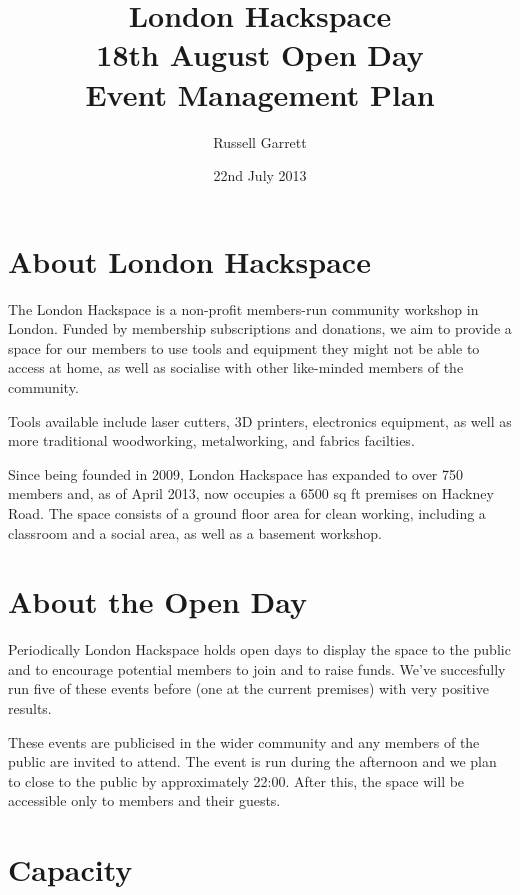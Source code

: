 \title{London Hackspace\\
    18th August Open Day\\
    Event Management Plan
}


\date{22nd July 2013}

\author{Russell Garrett}

\maketitle

\section{About London Hackspace}

The London Hackspace is a non-profit members-run community workshop in London.
Funded by membership subscriptions and donations, we aim to provide a space for
our members to use tools and equipment they might not be able to access at
home, as well as socialise with other like-minded members of the community.

Tools available include laser cutters, 3D printers, electronics equipment,
as well as more traditional woodworking, metalworking, and fabrics facilties.

Since being founded in 2009, London Hackspace has expanded to over 750 members
and, as of April 2013, now occupies a 6500 sq ft premises on Hackney Road.
The space consists of a ground floor area for clean working, including a
classroom and a social area, as well as a basement workshop.

\section{About the Open Day}

Periodically London Hackspace holds open days to display the space to the public
and to encourage potential members to join and to raise funds. We've succesfully
run five of these events before (one at the current premises) with very positive
results.

These events are publicised in the wider community and any members of the public are
invited to attend. The event is run during the afternoon and we plan to close to
the public by approximately 22:00. After this, the space will be accessible only
to members and their guests.

\section{Capacity}

